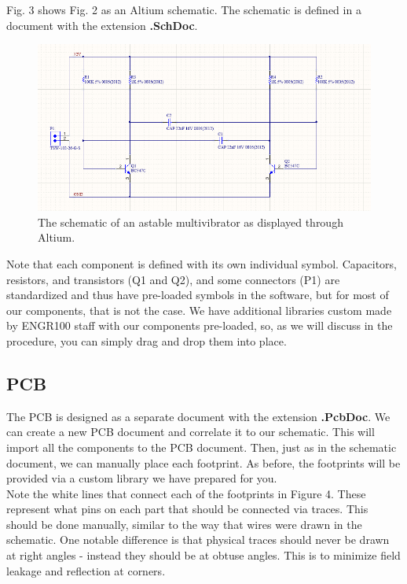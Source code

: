 \documentclass[12pt]{article}
\begin{document}
\noindent 
Fig. 3 shows Fig. 2 as an Altium schematic. The schematic is defined in a document with the extension \textbf{.SchDoc}. 
\begin{figure}[h]
    \begin{center}
    \includegraphics[scale=0.6]{Figures/Altium_sch_Wired.png}
    \caption{The schematic of an astable multivibrator as displayed through Altium.}
    \end{center}
    \end{figure}
Note that each component is defined with its own individual symbol. Capacitors, resistors, and transistors (Q1 and Q2), and some connectors (P1) are standardized and thus have pre-loaded symbols in the software, but for most of our components, that is not the case. We have additional libraries custom made by ENGR100 staff with our components pre-loaded, so, as we will discuss in the procedure, you can simply drag and drop them into place. 
    
	\subsection*{PCB}
    
    The PCB is designed as a separate document with the extension \textbf{.PcbDoc}. We can create a new PCB document and correlate it to our schematic. This will import all the components to the PCB document. Then, just as in the schematic document, we can manually place each footprint. As before, the footprints will be provided via a custom library we have prepared for you. \\
    
    
\noindent
Note the white lines that connect each of the footprints in Figure 4. These represent what pins on each part that should be connected via traces. This should be done manually, similar to the way that wires were drawn in the schematic. One notable difference is that physical traces should never be drawn at right angles - instead they should be at obtuse angles. This is to minimize field leakage and reflection at corners.\\
\end{document}
